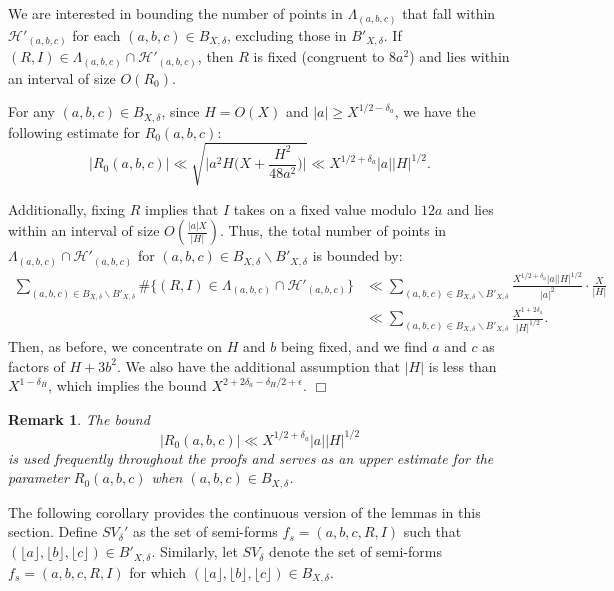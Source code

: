 \documentclass{article}
\def\H{{\mathcal H}}
\def\H{{\mathcal H}}
\newtheorem{remark}[theorem]{Remark}
\newenvironment{proof}{\noindent {\bf Proof:}}{$\Box$ \vspace{2 ex}}
\def \SV{{SV}_{\delta}}
\begin{document}
\begin{proof}
We are interested in bounding the number of points in $\Lambda_{(a, b, c)}$ that fall within $\H'_{(a, b, c)}$ for each $(a, b, c) \in B_{X, \delta}$, excluding those in $B'_{X, \delta}$. If $(R, I) \in \Lambda_{(a, b, c)} \cap \H'_{(a, b, c)}$, then $R$ is fixed (congruent to $8a^2$) and lies within an interval of size $O(R_0)$.

For any $(a, b, c) \in B_{X, \delta}$, since $H = O(X)$ and $|a| \geq X^{1/2 - \delta_a}$, we have the following estimate for $R_0(a, b, c)$: \begin{equation*} |R_0(a, b, c)| \ll \sqrt{\Big|a^2 H \Big( X + \frac{H^2}{48a^2} \Big)\Big|} \ll X^{1/2 + \delta_a} |a| |H|^{1/2}. \end{equation*}

Additionally, fixing $R$ implies that $I$ takes on a fixed value modulo $12a$ and lies within an interval of size $O\left( \frac{|a|X}{|H|} \right)$. Thus, the total number of points in $\Lambda_{(a, b, c)} \cap \H'_{(a, b, c)}$ for $(a, b, c) \in B_{X, \delta} \backslash B'_{X, \delta}$ is bounded by:
\begin{align*}
    \sum_{(a, b, c) \in B_{X, \delta} \backslash B'_{X, \delta}} \#\big\{ (R, I) \in \Lambda_{(a, b, c)} \cap \H'_{(a, b, c)} \big\} 
    &\ll \sum_{(a, b, c) \in B_{X, \delta} \backslash B'_{X, \delta}} \frac{X^{1/2 + \delta_a} |a| |H|^{1/2}}{|a|^2} \cdot \frac{X}{|H|} \\
    &\ll \sum_{(a, b, c) \in B_{X, \delta} \backslash B'_{X, \delta}} \frac{X^{1+2\delta_a}} {|H|^{1/2}}.
\end{align*}
Then, as before, we concentrate on $H$ and $b$ being fixed, and we find $a$ and $c$ as factors of $H + 3b^2$. We also have the additional assumption that $|H|$ is less than $X^{1 - \delta_H}$, which implies the bound $X^{2 + 2\delta_a - \delta_H/2 + \epsilon}$.
\end{proof}

\begin{remark}
The bound 
\begin{equation*} 
|R_0(a, b, c)| \ll  X^{1/2 + \delta_a} |a| |H|^{1/2} 
\end{equation*}
is used frequently throughout the proofs and serves as an upper estimate for the parameter $R_0(a, b, c)$ when $(a,b,c) \in B_{X,\delta}$.
\end{remark}
The following corollary provides the continuous version of the lemmas in this section. Define $\SV'$ as the set of semi-forms $f_s = (a, b, c, R, I)$ such that $(\lfloor a \rfloor, \lfloor b \rfloor, \lfloor c \rfloor) \in B'_{X,\delta}$. Similarly, let $\SV$ denote the set of semi-forms $f_s = (a, b, c, R, I)$ for which $(\lfloor a \rfloor, \lfloor b \rfloor, \lfloor c \rfloor) \in B_{X,\delta}$.
\end{document}
